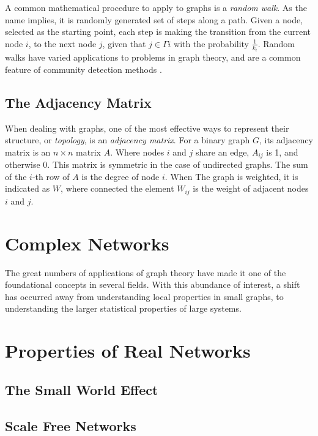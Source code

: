 A common mathematical procedure to apply to graphs is a \textit{random walk}. As the name implies, it is  randomly generated set of steps along a path. Given a node, selected as the starting point, each step is making the transition from the current node $i$, to the next node $j$, given that $j\in\Gamma{i}$ with the probability $\frac{1}{k_i}$. Random walks have varied applications to problems in graph theory, and are a common feature of community detection methods \cite{Pons2006}.



\subsection{The Adjacency Matrix}
When dealing with graphs, one of the most effective ways to represent their structure, or \textit{topology}, is an \textit{adjacency matrix}. For a binary graph $G$, its adjacency matrix is an $n\times n$ matrix $A$. Where nodes $i$ and $j$ share an edge, $A_{ij}$ is 1, and otherwise 0. This matrix is symmetric in the case of undirected graphs. The sum of the $i$-th row of $A$ is the degree of node $i$.
When The graph is weighted, it is indicated as $W$, where connected the element $W_{ij}$ is the weight of adjacent nodes $i$ and $j$.

\section{Complex Networks}
The great numbers of applications of graph theory have made it one of the foundational concepts in several fields. With this abundance of interest, a shift has occurred away from understanding local properties in small graphs, to understanding the larger statistical properties of large systems. 

\section{Properties of Real Networks}
\subsection{The Small World Effect}
\subsection{Scale Free Networks}

